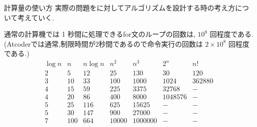 \begin{frame}{計算量の使い方}
    実際の問題をに対してアルゴリズムを設計する時の考え方について考えていく.
    
    通常の計算機では 1 秒間に処理できるfor文のループの回数は, $ 10^8 $ 回程度である.
    (Atcoderでは通常,制限時間が2秒間であるので命令実行の回数は $2 \times 10^8$ 回程度である.)
    \[
        \begin{array}{ *{7}{l}}
        \log{n} & n & n\log{n} & n^2 & n^3 & 2^n & n! \\
        \hline
        2 & 5 & 12 & 25 & 130 & 30 & 120 \\
        3 & 10 & 33 & 100 & 1000 & 1024 & 362880 \\
        4 & 15 & 59 & 225 & 3375 & 32768 & - \\
        4 & 20 & 86 & 400 & 8000 & 1048576 & - \\
        5 & 25 & 116 & 625 & 15625 & - & - \\
        5 & 30 & 147 & 900 & 27000 & - & - \\
        7 & 100 & 664 & 10000 & 1000000 & - & -
        \end{array}
    \]
\end{frame}

